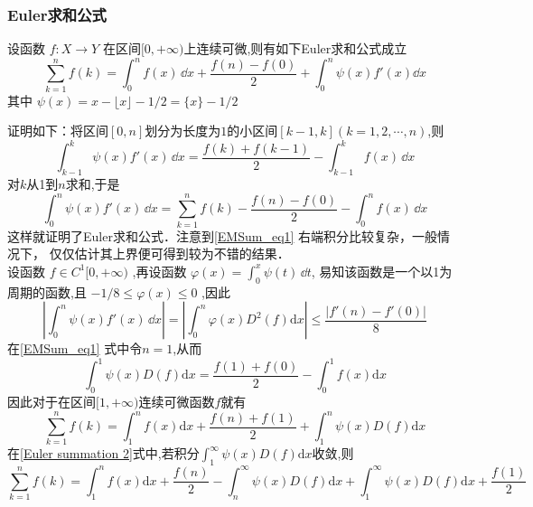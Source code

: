 
\subsubsection{Euler求和公式}
\begin{theorem}{}
    设函数 $f:X\to Y$ 在区间$[0,+\infty)$上连续可微,则有如下Euler求和公式成立	
        \begin{equation}\label{EMSum_eq1} 
            \sum_{k=1}^{n}f(k)=\int_{0}^{n}f(x)\,\dd x
            +\frac{f(n)-f(0)}{2}+\int_{0}^{n}\psi(x)f'(x)\dd x
        \end{equation}
    其中 $\psi(x)=x-\lfloor x \rfloor-1/2=\{x\}-1/2$
\end{theorem}
证明如下：将区间$[0,n]$划分为长度为$1$的小区间$[k-1,k](k=1,2,\cdots,n)$,则
​\[
\int_{k-1}^{k}\psi(x)f'(x)\,\dd x
=\frac{f(k)+f(k-1)}{2}-\int_{k-1}^{k}f(x)\,\dd x
\]
​对$k$从1到$n$求和,于是
​\[
\int_{0}^{n}\psi(x)f'(x)\,\dd x
=\sum_{k=1}^{n}f(k)-\frac{f(n)-f(0)}{2}-\int_{0}^{n}f(x)\,\dd x
\]
这样就证明了Euler求和公式．注意到\autoref{EMSum_eq1} 右端积分比较复杂，一般情况下，
仅仅估计其上界便可得到较为不错的结果．\\
设函数 $f\in{C^1[0,+\infty)}$ ,再设函数
$\varphi(x)=\displaystyle{\int_{0}^{x}\psi(t)\,\dd t}$,
易知该函数是一个以1为周期的函数,且
 $-1/8\leqslant\varphi(x)\leqslant 0$ ,因此
\begin{equation}
    \left|\int_{0}^{n}\psi(x)f'(x)\,\dd x\right|
    =\left|\int_{0}^{n}\varphi(x)D^2(f)\mathrm{d}x\right|
    \leqslant\frac{|f'(n)-f'(0)|}{8}
\end{equation}
在\autoref{EMSum_eq1}  式中令$n=1$,从而
	\[
		\int_{0}^{1}\psi(x)D(f)\mathrm{d}x=\frac{f(1)+f(0)}{2}-\int_{0}^{1}f(x)\mathrm{d}x
	\]
    因此对于在区间$[1,+\infty)$连续可微函数$f$就有
	\begin{equation}\label{Euler summation 2}
		\sum_{k=1}^{n}f(k)=\int_{1}^{n}f(x)\mathrm{d}x+\frac{f(n)+f(1)}{2}+\int_{1}^{n}\psi(x)D(f)\mathrm{d}x
	\end{equation}
	在\eqref{Euler summation 2}式中,若积分$\displaystyle{\int_{1}^{\infty}\psi(x)D(f)\mathrm{d}x}$收敛,则
	\begin{equation}\label{Euler summation 3}
		\sum_{k=1}^{n}f(k)=\int_{1}^{n}f(x)\mathrm{d}x+\frac{f(n)}{2}-\int_{n}^{\infty}\psi(x)D(f)\mathrm{d}x
		+\int_{1}^{\infty}\psi(x)D(f)\mathrm{d}x+\frac{f(1)}{2}
	\end{equation}